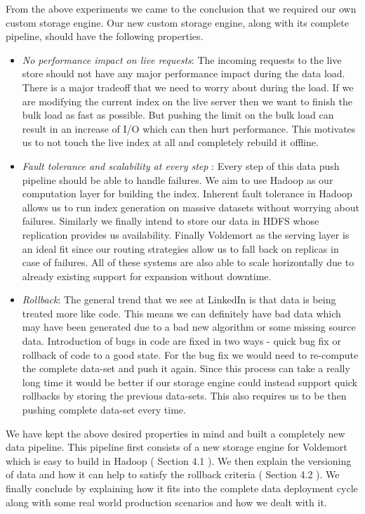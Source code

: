 \documentclass[10pt,twocolumn,preprint,natbib,authoryear]{sigplanconf}
\begin{document}
From the above experiments we came to the conclusion that we required our own custom storage engine. Our new custom storage engine, along with its complete pipeline, should have the following properties. 
\begin{itemize}
\item \emph {No performance impact on live requests}: The incoming requests to the live store should not have any major performance impact during the data load. There is a major tradeoff that we need to worry about during the load. If we are modifying the current index on the live server then we want to finish the bulk load as fast as possible. But pushing the limit on the bulk load can result in an increase of I/O which can then hurt performance. This motivates us to not touch the live index at all and completely rebuild it offline. 
\item \emph {Fault tolerance and scalability at every step }: Every step of this data push pipeline should be able to handle failures. We aim to use Hadoop as our computation layer for building the index. Inherent fault tolerance in Hadoop allows us to run index generation on massive datasets without worrying about failures. Similarly we finally intend to store our data in HDFS whose replication provides us availability. Finally Voldemort as the serving layer is an ideal fit since our routing strategies allow us to fall back on replicas in case of failures. All of these systems are also able to scale horizontally due to already existing support for expansion without downtime. 
\item \emph{Rollback}: The general trend that we see at LinkedIn is that data is being treated more like code. This means we can definitely have bad data which may have been generated due to a bad new algorithm or some missing source data. Introduction of bugs in code are fixed in two ways - quick bug fix or rollback of code to a good state. For the bug fix we would need to re-compute the complete data-set and push it again. Since this process can take a really long time it would be better if our storage engine could instead support quick rollbacks by storing the previous data-sets. This also requires us to be then pushing complete data-set every time. 
\end{itemize}

We have kept the above desired properties in mind and built a completely new data pipeline. This pipeline first consists of a new storage engine for Voldemort which is easy to build in Hadoop ( Section 4.1 ). We then explain the versioning of data and how it can help to satisfy the rollback criteria ( Section 4.2 ). We finally conclude by explaining how it fits into the complete data deployment cycle along with some real world production scenarios and how we dealt with it. 
\end{document}
